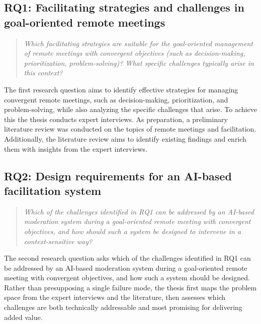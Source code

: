 \subsection{RQ1: Facilitating strategies and challenges in goal-oriented remote meetings}
\begin{quote}
  \textit{Which facilitating strategies are suitable for the goal-oriented management of remote meetings with
    convergent objectives (such as decision-making, prioritization, problem-solving)? What specific challenges
  typically arise in this context?}
\end{quote}
The first research question aims to identify effective strategies for managing convergent remote meetings,
such as decision-making, prioritization, and problem-solving, while also analyzing the specific challenges
that arise.
To achieve this the thesis conducts expert interviews. As preparation, a preliminary literature review was
conducted on the topics of remote meetings and facilitation. Additionally, the literature review aims to
identify existing findings and enrich them with insights from the expert interviews.

\subsection{RQ2: Design requirements for an AI-based facilitation system}
\begin{quote}
  \textit{Which of the challenges identified in RQ1 can be addressed by an AI-based moderation system during
    a goal-oriented remote meeting with convergent objectives, and how should such a system be designed to
  intervene in a context-sensitive way?}
\end{quote}
The second research question asks which of the challenges identified in RQ1 can be addressed by an
AI-based moderation system during a goal-oriented remote meeting with convergent objectives, and how such a
system should be designed. Rather than presupposing a single failure mode, the thesis first maps the
problem space from the expert interviews and the literature, then assesses which challenges are both
technically addressable and most promising for delivering added value.

